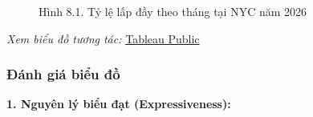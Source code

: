 \begin{figure}[H]
    \centering
    \caption{Hình 8.1. Tỷ lệ lấp đầy theo tháng tại NYC năm 2026}
    \label{fig:domain-task8-chart1}
\end{figure}

\noindent\small\textit{Xem biểu đồ tương tác: }\href{https://public.tableau.com/app/profile/duy.le4605/viz/Group10_17788537028430/Task8_1-MonthlyOccupancyRate?publish=yes}{Tableau Public}\normalsize

\subsubsection{Đánh giá biểu đồ}

\textbf{1. Nguyên lý biểu đạt (Expressiveness):}

